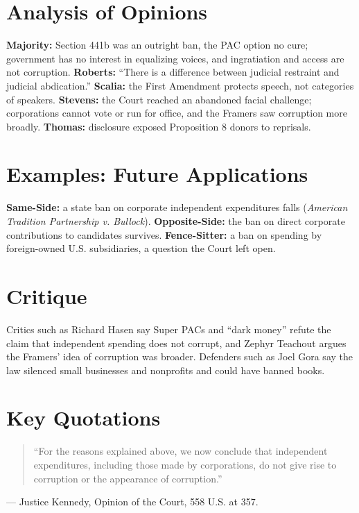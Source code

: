 \documentclass[12pt]{article}
\begin{document}
\section{Analysis of Opinions}
\textbf{Majority:} Section 441b was an outright ban, the PAC option no cure; government has no interest in equalizing voices, and ingratiation and access are not corruption. \textbf{Roberts:} ``There is a difference between judicial restraint and judicial abdication.'' \textbf{Scalia:} the First Amendment protects speech, not categories of speakers. \textbf{Stevens:} the Court reached an abandoned facial challenge; corporations cannot vote or run for office, and the Framers saw corruption more broadly. \textbf{Thomas:} disclosure exposed Proposition 8 donors to reprisals.

\section{Examples: Future Applications}
\textbf{Same-Side:} a state ban on corporate independent expenditures falls (\textit{American Tradition Partnership v. Bullock}). \textbf{Opposite-Side:} the ban on direct corporate contributions to candidates survives. \textbf{Fence-Sitter:} a ban on spending by foreign-owned U.S. subsidiaries, a question the Court left open.

\section{Critique}
Critics such as Richard Hasen say Super PACs and ``dark money'' refute the claim that independent spending does not corrupt, and Zephyr Teachout argues the Framers' idea of corruption was broader. Defenders such as Joel Gora say the law silenced small businesses and nonprofits and could have banned books.

\section{Key Quotations}
\begin{quote}
``For the reasons explained above, we now conclude that independent expenditures, including those made by corporations, do not give rise to corruption or the appearance of corruption.''
\end{quote}
\noindent --- Justice Kennedy, Opinion of the Court, 558 U.S. at 357.
\end{document}

